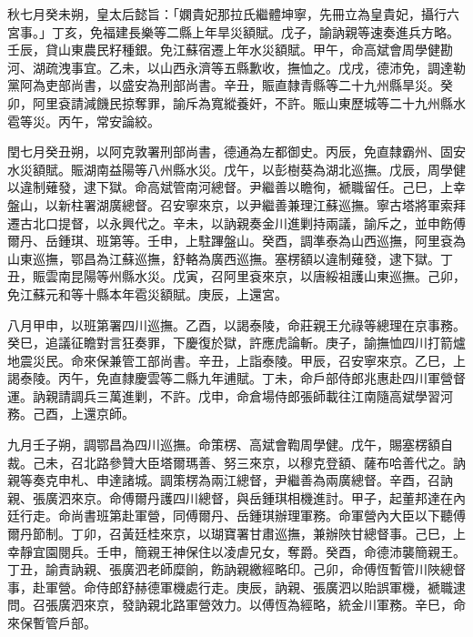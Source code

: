 \begin{pinyinscope}
秋七月癸未朔，皇太后懿旨：「嫻貴妃那拉氏繼體坤寧，先冊立為皇貴妃，攝行六宮事。」丁亥，免福建長樂等二縣上年旱災額賦。戊子，諭訥親等速奏進兵方略。壬辰，貸山東農民籽種銀。免江蘇宿遷上年水災額賦。甲午，命高斌會周學健勘河、湖疏洩事宜。乙未，以山西永濟等五縣歉收，撫恤之。戊戌，德沛免，調達勒黨阿為吏部尚書，以盛安為刑部尚書。辛丑，賑直隸青縣等二十九州縣旱災。癸卯，阿里袞請減饑民掠奪罪，諭斥為寬縱養奸，不許。賑山東歷城等二十九州縣水雹等災。丙午，常安論絞。

閏七月癸丑朔，以阿克敦署刑部尚書，德通為左都御史。丙辰，免直隸霸州、固安水災額賦。賑湖南益陽等八州縣水災。戊午，以彭樹葵為湖北巡撫。戊辰，周學健以違制薙發，逮下獄。命高斌管南河總督。尹繼善以瞻徇，褫職留任。己巳，上幸盤山，以新柱署湖廣總督。召安寧來京，以尹繼善兼理江蘇巡撫。寧古塔將軍索拜遷古北口提督，以永興代之。辛未，以訥親奏金川進剿持兩議，諭斥之，並申飭傅爾丹、岳鍾琪、班第等。壬申，上駐蹕盤山。癸酉，調準泰為山西巡撫，阿里袞為山東巡撫，鄂昌為江蘇巡撫，舒輅為廣西巡撫。塞楞額以違制薙發，逮下獄。丁丑，賑雲南昆陽等州縣水災。戊寅，召阿里袞來京，以唐綏祖護山東巡撫。己卯，免江蘇元和等十縣本年雹災額賦。庚辰，上還宮。

八月甲申，以班第署四川巡撫。乙酉，以謁泰陵，命莊親王允祿等總理在京事務。癸巳，追議征瞻對言狂奏罪，下慶復於獄，許應虎論斬。庚子，諭撫恤四川打箭爐地震災民。命來保兼管工部尚書。辛丑，上詣泰陵。甲辰，召安寧來京。乙巳，上謁泰陵。丙午，免直隸慶雲等二縣九年逋賦。丁未，命戶部侍郎兆惠赴四川軍營督運。訥親請調兵三萬進剿，不許。戊申，命倉場侍郎張師載往江南隨高斌學習河務。己酉，上還京師。

九月壬子朔，調鄂昌為四川巡撫。命策楞、高斌會鞫周學健。戊午，賜塞楞額自裁。己未，召北路參贊大臣塔爾瑪善、努三來京，以穆克登額、薩布哈善代之。訥親等奏克申札、申達諸城。調策楞為兩江總督，尹繼善為兩廣總督。辛酉，召訥親、張廣泗來京。命傅爾丹護四川總督，與岳鍾琪相機進討。甲子，起董邦達在內廷行走。命尚書班第赴軍營，同傅爾丹、岳鍾琪辦理軍務。命軍營內大臣以下聽傅爾丹節制。丁卯，召黃廷桂來京，以瑚寶署甘肅巡撫，兼辦陜甘總督事。己巳，上幸靜宜園閱兵。壬申，簡親王神保住以凌虐兄女，奪爵。癸酉，命德沛襲簡親王。丁丑，諭責訥親、張廣泗老師糜餉，飭訥親繳經略印。己卯，命傅恆暫管川陜總督事，赴軍營。命侍郎舒赫德軍機處行走。庚辰，訥親、張廣泗以貽誤軍機，褫職逮問。召張廣泗來京，發訥親北路軍營效力。以傅恆為經略，統金川軍務。辛巳，命來保暫管戶部。


\end{pinyinscope}
